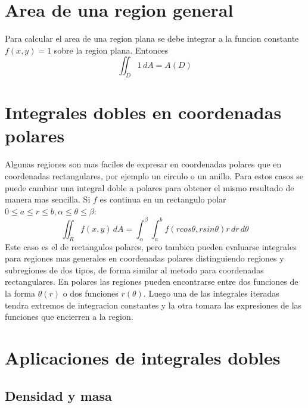 \documentclass[12pt]{article}
\begin{document}
\section{Area de una region general}
Para calcular el area de una region plana se debe integrar a la funcion constante $f(x,y) = 1$
sobre la region plana. Entonces
$$\iint_D 1 \,dA = A(D)$$
\section{Integrales dobles en coordenadas polares}
Algunas regiones son mas faciles de expresar en coordenadas polares que en coordenadas
rectangulares, por ejemplo un circulo o un anillo. Para estos casos se puede cambiar 
una integral doble a polares para obtener el mismo resultado de manera mas sencilla.
Si $f$ es continua en un rectangulo polar $0\leq a \leq r \leq b, \alpha \leq \theta \leq \beta$:
$$\iint_R f(x,y)\,dA = \int_{\alpha}^{\beta}\int_a^b f(r cos\theta, r sin\theta) r \,dr \,d\theta$$
Este caso es el de rectangulos polares, pero tambien pueden evaluarse integrales para regiones mas
generales en coordenadas polares distinguiendo regiones y subregiones de dos tipos, de forma similar
al metodo para coordenadas rectangulares. En polares las regiones pueden encontrarse entre dos funciones
de la forma $\theta(r)$ o dos funciones $r(\theta)$. Luego una de las integrales iteradas tendra
extremos de integracion constantes y la otra tomara las expresiones de las funciones que encierren
a la region.
\section{Aplicaciones de integrales dobles}
\subsection{Densidad y masa}
\end{document}
